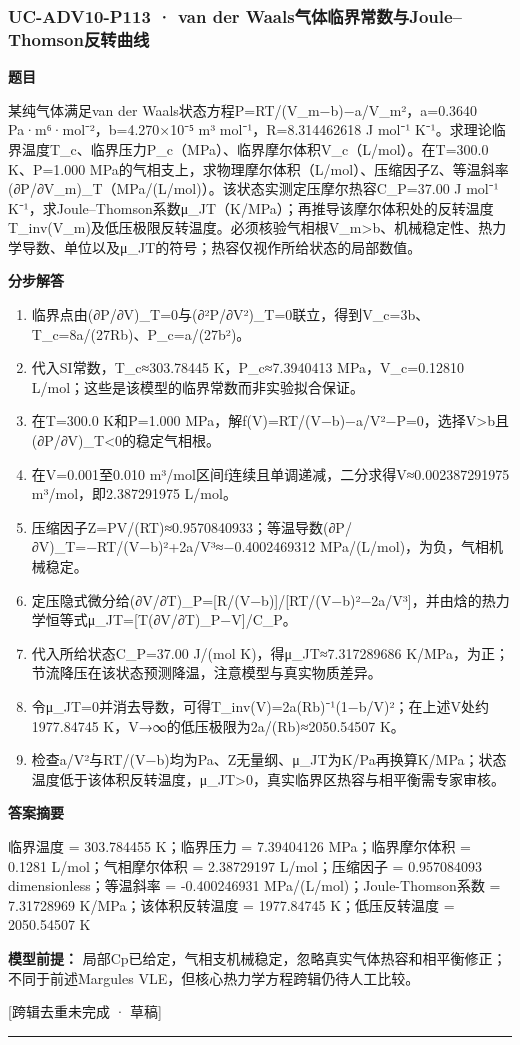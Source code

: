 \documentclass[UTF8,11pt,a4paper]{ctexart}
\begin{document}
\subsubsection*{UC-ADV10-P113 · van der Waals气体临界常数与Joule–Thomson反转曲线}
\noindent\textbf{题目}\par
某纯气体满足van der Waals状态方程P=RT/(V\_m−b)−a/V\_m²，a=0.3640 Pa·m⁶·mol⁻²，b=4.270×10⁻⁵ m³ mol⁻¹，R=8.314462618 J mol⁻¹ K⁻¹。求理论临界温度T\_c、临界压力P\_c（MPa）、临界摩尔体积V\_c（L/mol）。在T=300.0 K、P=1.000 MPa的气相支上，求物理摩尔体积（L/mol）、压缩因子Z、等温斜率(∂P/∂V\_m)\_T（MPa/(L/mol)）。该状态实测定压摩尔热容C\_P=37.00 J mol⁻¹ K⁻¹，求Joule–Thomson系数μ\_JT（K/MPa）；再推导该摩尔体积处的反转温度T\_inv(V\_m)及低压极限反转温度。必须核验气相根V\_m>b、机械稳定性、热力学导数、单位以及μ\_JT的符号；热容仅视作所给状态的局部数值。\par
\medskip\noindent\textbf{分步解答}
\begin{enumerate}
\item 临界点由(∂P/∂V)\_T=0与(∂²P/∂V²)\_T=0联立，得到V\_c=3b、T\_c=8a/(27Rb)、P\_c=a/(27b²)。
\item 代入SI常数，T\_c≈303.78445 K，P\_c≈7.3940413 MPa，V\_c=0.12810 L/mol；这些是该模型的临界常数而非实验拟合保证。
\item 在T=300.0 K和P=1.000 MPa，解f(V)=RT/(V−b)−a/V²−P=0，选择V>b且(∂P/∂V)\_T<0的稳定气相根。
\item 在V=0.001至0.010 m³/mol区间f连续且单调递减，二分求得V≈0.002387291975 m³/mol，即2.387291975 L/mol。
\item 压缩因子Z=PV/(RT)≈0.9570840933；等温导数(∂P/∂V)\_T=−RT/(V−b)²+2a/V³≈−0.4002469312 MPa/(L/mol)，为负，气相机械稳定。
\item 定压隐式微分给(∂V/∂T)\_P=[R/(V−b)]/[RT/(V−b)²−2a/V³]，并由焓的热力学恒等式μ\_JT=[T(∂V/∂T)\_P−V]/C\_P。
\item 代入所给状态C\_P=37.00 J/(mol K)，得μ\_JT≈7.317289686 K/MPa，为正；节流降压在该状态预测降温，注意模型与真实物质差异。
\item 令μ\_JT=0并消去导数，可得T\_inv(V)=2a(Rb)⁻¹(1−b/V)²；在上述V处约1977.84745 K，V→∞的低压极限为2a/(Rb)≈2050.54507 K。
\item 检查a/V²与RT/(V−b)均为Pa、Z无量纲、μ\_JT为K/Pa再换算K/MPa；状态温度低于该体积反转温度，μ\_JT>0，真实临界区热容与相平衡需专家审核。
\end{enumerate}
\noindent\textbf{答案摘要}\par
临界温度 = 303.784455 K；临界压力 = 7.39404126 MPa；临界摩尔体积 = 0.1281 L/mol；气相摩尔体积 = 2.38729197 L/mol；压缩因子 = 0.957084093 dimensionless；等温斜率 = -0.400246931 MPa/(L/mol)；Joule-Thomson系数 = 7.31728969 K/MPa；该体积反转温度 = 1977.84745 K；低压反转温度 = 2050.54507 K\par
\noindent\textbf{模型前提：}
局部Cp已给定，气相支机械稳定，忽略真实气体热容和相平衡修正；不同于前述Margules VLE，但核心热力学方程跨辑仍待人工比较。\par
\noindent\textcolor{red!65!black}{[跨辑去重未完成 · 草稿]} \par
\medskip\hrule\medskip
{}
\end{document}
